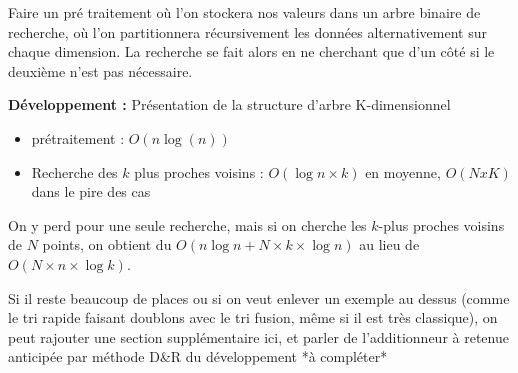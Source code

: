 \begin{algo}[Solution D\&R]
	Faire un pré traitement où l'on stockera nos valeurs dans un arbre binaire de recherche, où l'on partitionnera récursivement les données alternativement sur chaque dimension. La recherche se fait alors en ne cherchant que d'un côté si le deuxième n'est pas nécessaire.
\end{algo}

\textbf{Développement :} Présentation de la structure d'arbre K-dimensionnel

\begin{proposition}[Complexité]
	\begin{itemize}
		\item prétraitement : $O(n \log(n))$
		\item Recherche des $k$ plus proches voisins : $O(\log n \times k)$ en moyenne, $O(N x K)$ dans le pire des cas
	\end{itemize}
\end{proposition}


\begin{rem}
	On y perd pour une seule recherche, mais si on cherche les $k$-plus proches voisins de $N$ points, on obtient du $O(n \log n + N \times k \times \log n)$ au lieu de $O(N \times n \times \log k)$.
\end{rem}

\begin{com}
	Si il reste beaucoup de places ou si on veut enlever un exemple au dessus (comme le tri rapide faisant doublons avec le tri fusion, même si il est très classique), on peut rajouter une section supplémentaire ici, et parler de l'additionneur à retenue anticipée par méthode D\&R du développement *à compléter*
\end{com}